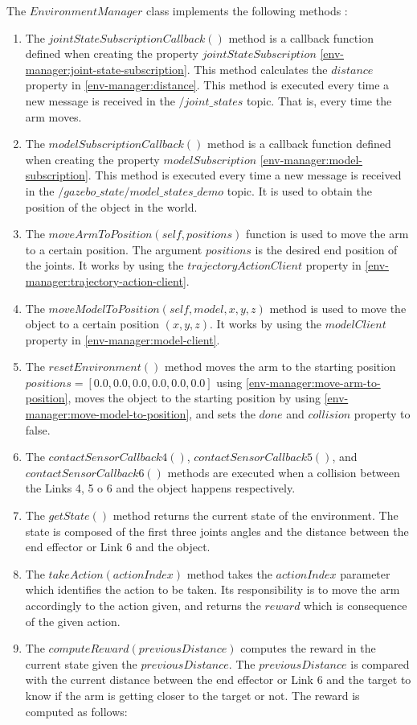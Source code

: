 \documentclass[12pt,oneside]{article}
\begin{document}
The $EnvironmentManager$ class implements the following methods :
\begin{enumerate}
\item The $jointStateSubscriptionCallback()$ method is a callback function defined when creating the property $jointStateSubscription$ \ref{env-manager:joint-state-subscription}. This method calculates the $distance$ property in \ref{env-manager:distance}. This method is executed every time a new message is received in the $/joint\_states$ topic. That is, every time the arm moves.
\item The $modelSubscriptionCallback()$ method is a callback function defined when creating the property $modelSubscription$ \ref{env-manager:model-subscription}. This method is executed every time a new message is received in the $/gazebo\_state/model\_states\_demo$ topic. It is used to obtain the position of the object in the world.
\item\label{env-manager:move-arm-to-position} The $moveArmToPosition(self, positions)$ function is used to move the arm to a certain position. The argument $positions$ is the desired end position of the joints. It works by using the $trajectoryActionClient$ property in \ref{env-manager:trajectory-action-client}.
\item\label{env-manager:move-model-to-position} The $moveModelToPosition(self, model, x, y, z)$ method is used to move the object to a certain position $(x, y, z)$. It works by using the $modelClient$ property in \ref{env-manager:model-client}.
\item The $resetEnvironment()$ method moves the arm to the starting position $positions = [0.0, 0.0, 0.0, 0.0, 0.0, 0.0]$ using \ref{env-manager:move-arm-to-position}, moves the object to the starting position by using \ref{env-manager:move-model-to-position}, and sets the $done$ and $collision$ property to false. 
\item The $contactSensorCallback4()$, $contactSensorCallback5()$, and $contactSensorCallback6()$ methods are executed when a collision between the Links 4, 5 o 6 and the object happens respectively.
\item The $getState()$ method returns the current state of the environment. The state is composed of the first three joints angles and the distance between the end effector or Link 6 and the object. 
\item The $takeAction(actionIndex)$ method takes the $actionIndex$ parameter which identifies the action to be taken. Its responsibility is to move the arm accordingly to the action given, and returns the $reward$ which is consequence of the given action.
\item The $computeReward(previousDistance)$ computes the reward in the current state given the $previousDistance$. The $previousDistance$ is compared with the current distance between the end effector or Link 6 and the target to know if the arm is getting closer to the target or not. The reward is computed as follows:\\


\end{enumerate}
\end{document}
